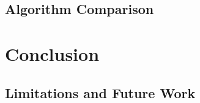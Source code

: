 \documentclass{article}
\begin{document}
\subsection{Algorithm Comparison}

\section{Conclusion}

\subsection{Limitations and Future Work}



\end{document}
